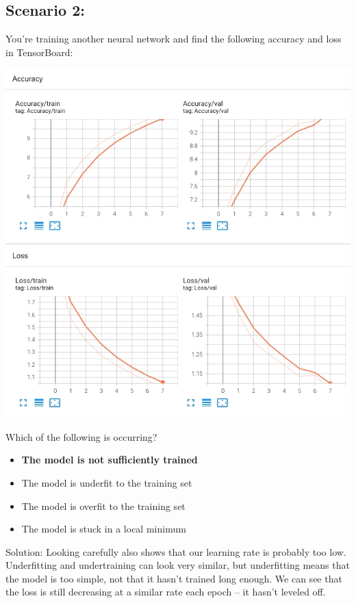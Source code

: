 \subsection{Scenario 2:}

You're training another neural network and find the following accuracy and loss in TensorBoard:

\includegraphics[width=1\linewidth]{img//intro//trainingNN/screen-shot-2022-04-10-at-7.44.41-am.jpeg}

Which of the following is occurring?
\begin{itemize}
    \item \textbf{The model is not sufficiently trained}
    \item The model is underfit to the training set
    \item The model is overfit to the training set
    \item The model is stuck in a local minimum
\end{itemize}
Solution: Looking carefully also shows that our learning rate is probably too low. Underfitting and undertraining can look very similar, but underfitting means that the model is too simple, not that it hasn't trained long enough. We can see that the loss is still decreasing at a similar rate each epoch -- it hasn't leveled off.

